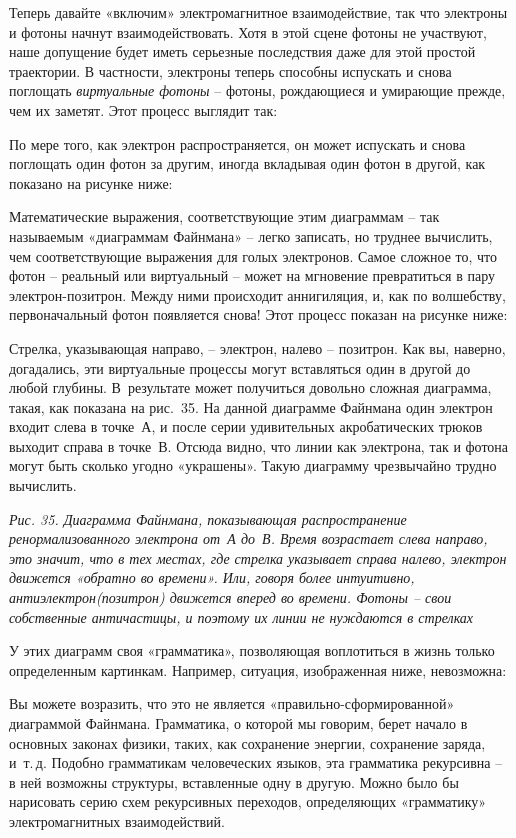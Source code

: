 \documentclass[../main.tex]{subfiles}
\begin{document}
Теперь давайте «включим» электромагнитное взаимодействие, так что электроны и фотоны начнут взаимодействовать. Хотя в этой сцене фотоны не участвуют, наше допущение будет иметь серьезные последствия даже для этой простой траектории. В частности, электроны теперь способны испускать и снова поглощать \emph{виртуальные фотоны} \--- фотоны, рождающиеся и умирающие прежде, чем их заметят. Этот процесс выглядит так:

По мере того, как электрон распространяется, он может испускать и снова поглощать один фотон за другим, иногда вкладывая один фотон в другой, как показано на рисунке ниже:

Математические выражения, соответствующие этим диаграммам \--- так называемым «диаграммам Файнмана» \--- легко записать, но труднее вычислить, чем соответствующие выражения для голых электронов. Самое сложное то, что фотон \--- реальный или виртуальный \--- может на мгновение превратиться в пару электрон-позитрон. Между ними происходит аннигиляция, и, как по волшебству, первоначальный фотон появляется снова! Этот процесс показан на рисунке ниже:

Стрелка, указывающая направо, \--- электрон, налево \--- позитрон. Как вы, наверно, догадались, эти виртуальные процессы могут вставляться один в другой до любой глубины. В~результате может получиться довольно сложная диаграмма, такая, как показана на рис.~35. На данной диаграмме Файнмана один электрон входит слева в точке~А, и после серии удивительных акробатических трюков выходит справа в точке~В\@. Отсюда видно, что линии как электрона, так и фотона могут быть сколько угодно «украшены». Такую диаграмму чрезвычайно трудно вычислить.

\emph{Рис. 35. Диаграмма Файнмана, показывающая распространение ренормализованного электрона от~А до~В\@. Время возрастает слева направо, это значит, что в тех местах, где стрелка указывает справа налево, электрон движется «обратно во времени». Или, говоря более интуитивно, антиэлектрон(позитрон) движется вперед во времени. Фотоны \--- свои собственные античастицы, и поэтому их линии не нуждаются в стрелках}

У этих диаграмм своя «грамматика», позволяющая воплотиться в жизнь только определенным картинкам. Например, ситуация, изображенная ниже, невозможна:

Вы можете возразить, что это не является «правильно-сформированной» диаграммой Файнмана. Грамматика, о которой мы говорим, берет начало в основных законах физики, таких, как сохранение энергии, сохранение заряда, и~т.\,д. Подобно грамматикам человеческих языков, эта грамматика рекурсивна \--- в ней возможны структуры, вставленные одну в другую. Можно было бы нарисовать серию схем рекурсивных переходов, определяющих «грамматику» электромагнитных взаимодействий.
\end{document}
